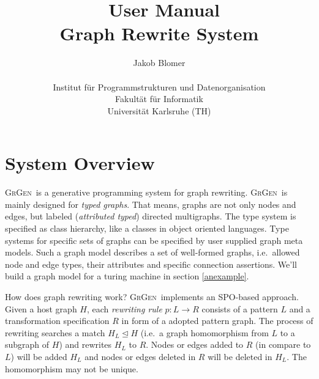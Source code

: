 \documentclass[a4paper,11pt]{report}
\title{\GrG\ User Manual \\ Graph Rewrite System}
\author{Jakob Blomer \\ \\ Institut für Programmstrukturen und Datenorganisation\\
Fakultät für Informatik\\
Universität Karlsruhe (TH)}
\providecommand{\GrG}{{\scshape GrGen}}
\begin{document}
\maketitle

\tableofcontents

\chapter{System Overview}

\GrG\ is a generative programming system for graph rewriting. \GrG\ is mainly designed for \emph{typed graphs}.  That means, graphs are not only nodes and edges, but labeled (\emph{attributed typed}) directed multigraphs. The type system is specified as class hierarchy, like a classes in object oriented languages. Type systems for specific sets of graphs can be specified by user supplied graph meta models. Such a graph model describes a set of well-formed graphs, i.e.\ allowed node and edge types, their attributes and specific connection assertions. We'll build a graph model for a turing machine in section \ref{anexample}.

How does graph rewriting work? \GrG\ implements an SPO-based approach. Given a host graph $H$, each \emph{rewriting rule} $p: L \longrightarrow R$ consists of a pattern $L$ and a transformation specification $R$ in form of a adopted pattern graph. The process of rewriting searches a match $H_L \unlhd H$ (i.e.\ a graph homomorphism from $L$ to a subgraph of $H$) and rewrites $H_L$ to $R$. Nodes or edges added to $R$ (in compare to $L$) will be added $H_L$ and nodes or edges deleted in $R$ will be deleted in $H_L$. The homomorphism may not be unique.
\end{document}
